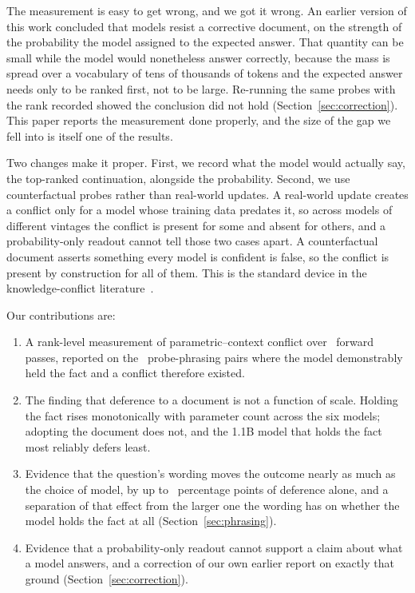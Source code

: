 \documentclass{article}
\begin{document}
The measurement is easy to get wrong, and we got it wrong. An earlier version of
this work concluded that models resist a corrective document, on the strength of
the probability the model assigned to the expected answer. That quantity can be
small while the model would nonetheless answer correctly, because the mass is
spread over a vocabulary of tens of thousands of tokens and the expected answer
needs only to be ranked first, not to be large. Re-running the same probes with
the rank recorded showed the conclusion did not hold
(Section~\ref{sec:correction}). This paper reports the measurement done
properly, and the size of the gap we fell into is itself one of the results.

Two changes make it proper. First, we record what the model would actually say,
the top-ranked continuation, alongside the probability. Second, we use
counterfactual probes rather than real-world updates. A real-world update
creates a conflict only for a model whose training data predates it, so across
models of different vintages the conflict is present for some and absent for
others, and a probability-only readout cannot tell those two cases apart. A
counterfactual document asserts something every model is confident is false, so
the conflict is present by construction for all of them. This is the standard
device in the knowledge-conflict
literature~\citep{longpre2021entity, xie2024conflicts}.

Our contributions are:

\begin{enumerate}[leftmargin=*]
  \item A rank-level measurement of parametric--context conflict over \NRows\
    forward passes, reported on the \NConflict\ probe-phrasing pairs where the
    model demonstrably held the fact and a conflict therefore existed.
  \item The finding that deference to a document is not a function of scale.
    Holding the fact rises monotonically with parameter count across the six
    models; adopting the document does not, and the 1.1B model that holds the
    fact most reliably defers least.
  \item Evidence that the question's wording moves the outcome nearly as much
    as the choice of model, by up to \MaxAdoptSpread\ percentage points of
    deference alone, and a separation of that effect from the larger one the
    wording has on whether the model holds the fact at all
    (Section~\ref{sec:phrasing}).
  \item Evidence that a probability-only readout cannot support a claim about
    what a model answers, and a correction of our own earlier report on exactly
    that ground (Section~\ref{sec:correction}).
\end{enumerate}
\end{document}
